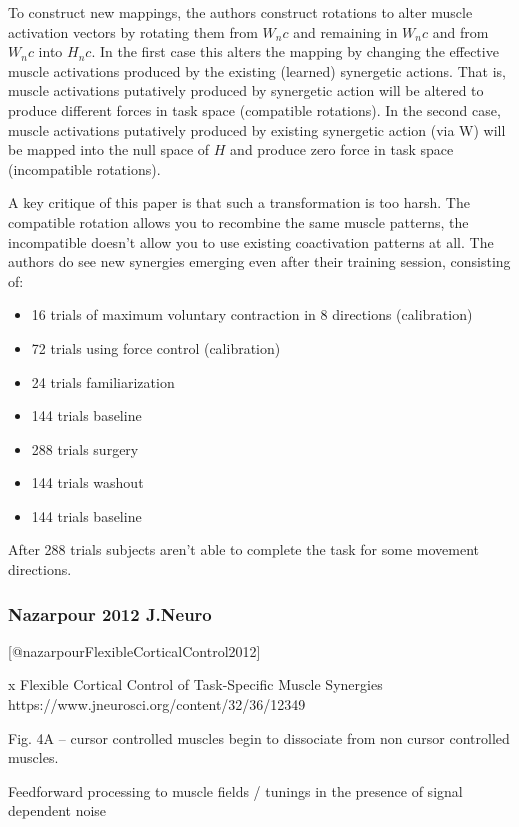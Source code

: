 \documentclass[../main.tex]{subfiles}
\begin{document}
{{{{{{{{{{{To construct new mappings, the authors construct rotations to alter
muscle activation vectors by rotating them from \(W_nc\) and remaining
in \(W_nc\) and from \(W_nc\) into \(H_nc\). In the first case this
alters the mapping by changing the effective muscle activations produced
by the existing (learned) synergetic actions. That is, muscle
activations putatively produced by synergetic action will be altered to
produce different forces in task space (compatible rotations). In the
second case, muscle activations putatively produced by existing
synergetic action (via W) will be mapped into the null space of \(H\)
and produce zero force in task space (incompatible rotations).

A key critique of this paper is that such a transformation is too harsh.
The compatible rotation allows you to recombine the same muscle
patterns, the incompatible doesn't allow you to use existing
coactivation patterns at all. The authors do see new synergies emerging
even after their training session, consisting of:

\begin{itemize}
\tightlist
\item
  16 trials of maximum voluntary contraction in 8 directions
  (calibration)
\item
  72 trials using force control (calibration)
\item
  24 trials familiarization
\item
  144 trials baseline
\item
  288 trials surgery
\item
  144 trials washout
\item
  144 trials baseline
\end{itemize}

After 288 trials subjects aren't able to complete the task for some
movement directions.

\subsubsection{Nazarpour 2012 J.Neuro}\label{nazarpour-2012-j.neuro}

{[}@nazarpourFlexibleCorticalControl2012{]}

x Flexible Cortical Control of Task-Specific Muscle Synergies
https://www.jneurosci.org/content/32/36/12349

Fig. 4A -- cursor controlled muscles begin to dissociate from non cursor
controlled muscles.

Feedforward processing to muscle fields / tunings in the presence of
signal dependent noise

}}}}}}}}}}}
\end{document}
